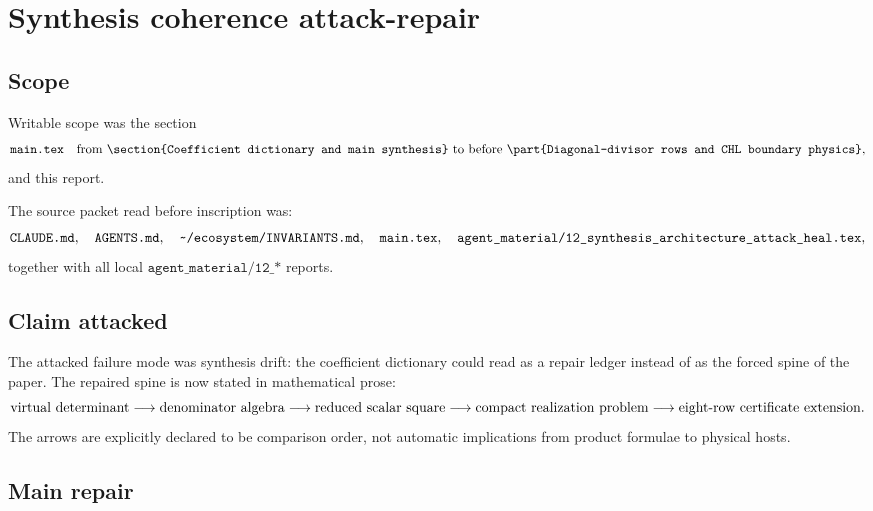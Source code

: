 \section{Synthesis coherence attack-repair}
\label{sec:synthesis-coherence-attack-repair}

\subsection{Scope}

Writable scope was the section
\[
\texttt{main.tex}
\quad
\hbox{from }
\texttt{\string\section\{Coefficient dictionary and main synthesis\}}
\hbox{ to before }
\texttt{\string\part\{Diagonal-divisor rows and CHL boundary physics\}},
\]
and this report.

The source packet read before inscription was:
\[
\texttt{CLAUDE.md},\quad
\texttt{AGENTS.md},\quad
\texttt{\string~/ecosystem/INVARIANTS.md},\quad
\texttt{main.tex},\quad
\texttt{agent\_material/12\_synthesis\_architecture\_attack\_heal.tex},
\]
together with all local \(\texttt{agent\_material/12\_*}\) reports.

\subsection{Claim attacked}

The attacked failure mode was synthesis drift: the coefficient
dictionary could read as a repair ledger instead of as the forced spine
of the paper.  The repaired spine is now stated in mathematical prose:
\[
\hbox{virtual determinant}
\longrightarrow
\hbox{denominator algebra}
\longrightarrow
\hbox{reduced scalar square}
\longrightarrow
\hbox{compact realization problem}
\longrightarrow
\hbox{eight-row certificate extension}.
\]
The arrows are explicitly declared to be comparison order, not automatic
implications from product formulae to physical hosts.

\subsection{Main repair}


